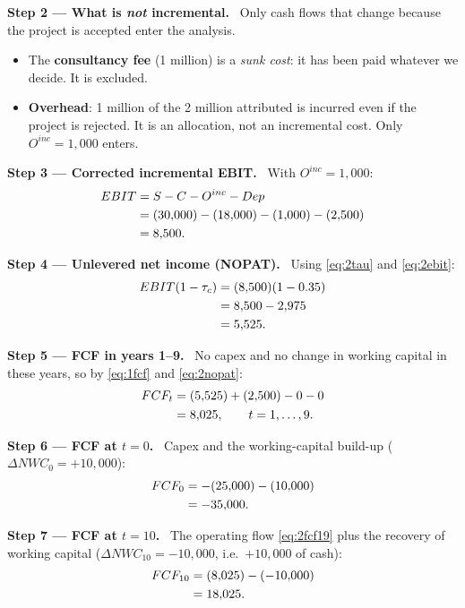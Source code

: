 \documentclass[11pt,a4paper]{article}
\numberwithin{equation}{section}
\newcommand{\step}[2]{\par\medskip\noindent\textbf{Step #1 --- #2.}~}
\begin{document}
\step{2}{What is \emph{not} incremental} Only cash flows that change because the project is
accepted enter the analysis.
\begin{itemize}[leftmargin=1.4em]
  \item The \textbf{consultancy fee} (1 million) is a \emph{sunk cost}: it has been paid whatever we
        decide. It is excluded.
  \item \textbf{Overhead}: 1 million of the 2 million attributed is incurred even if the project is
        rejected. It is an allocation, not an incremental cost. Only $O^{inc}=1{,}000$ enters.
\end{itemize}

\step{3}{Corrected incremental EBIT} With $O^{inc}=1{,}000$:
\begin{align}
  EBIT &= S - C - O^{inc} - Dep \notag\\
       &= (30{,}000) - (18{,}000) - (1{,}000) - (2{,}500) \notag\\
       &= 8{,}500 . \label{eq:2ebit}
\end{align}

\step{4}{Unlevered net income (NOPAT)} Using \eqref{eq:2tau} and \eqref{eq:2ebit}:
\begin{align}
  EBIT(1-\tau_c) &= (8{,}500)(1-0.35) \notag\\
                 &= 8{,}500 - 2{,}975 \notag\\
                 &= 5{,}525 . \label{eq:2nopat}
\end{align}

\step{5}{FCF in years 1--9} No capex and no change in working capital in these years, so by
\eqref{eq:1fcf} and \eqref{eq:2nopat}:
\begin{align}
  FCF_t &= (5{,}525) + (2{,}500) - 0 - 0 \notag\\
        &= 8{,}025, \qquad t=1,\dots,9. \label{eq:2fcf19}
\end{align}

\step{6}{FCF at $t=0$} Capex and the working-capital build-up ($\Delta NWC_0 = +10{,}000$):
\begin{align}
  FCF_0 &= -(25{,}000) - (10{,}000) \notag\\
        &= -35{,}000 . \label{eq:2fcf0}
\end{align}

\step{7}{FCF at $t=10$} The operating flow \eqref{eq:2fcf19} plus the recovery of working capital
($\Delta NWC_{10} = -10{,}000$, i.e.\ $+10{,}000$ of cash):
\begin{align}
  FCF_{10} &= (8{,}025) - (-10{,}000) \notag\\
           &= 18{,}025 . \label{eq:2fcf10}
\end{align}
\end{document}

